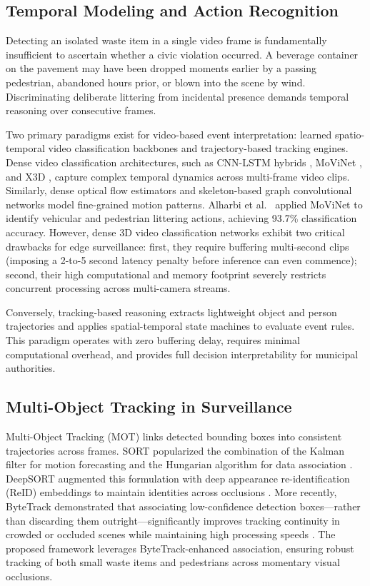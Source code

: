 \documentclass[conference]{IEEEtran}
\begin{document}
\subsection{Temporal Modeling and Action Recognition}

Detecting an isolated waste item in a single video frame is fundamentally insufficient to ascertain whether a civic violation occurred. A beverage container on the pavement may have been dropped moments earlier by a passing pedestrian, abandoned hours prior, or blown into the scene by wind. Discriminating deliberate littering from incidental presence demands temporal reasoning over consecutive frames.

Two primary paradigms exist for video-based event interpretation: learned spatio-temporal video classification backbones and trajectory-based tracking engines. Dense video classification architectures, such as CNN-LSTM hybrids \cite{b9}, MoViNet \cite{b10}, and X3D \cite{b23}, capture complex temporal dynamics across multi-frame video clips. Similarly, dense optical flow estimators \cite{b16} and skeleton-based graph convolutional networks \cite{b17} model fine-grained motion patterns. Alharbi et al.\ \cite{b10} applied MoViNet to identify vehicular and pedestrian littering actions, achieving 93.7\% classification accuracy. However, dense 3D video classification networks exhibit two critical drawbacks for edge surveillance: first, they require buffering multi-second clips (imposing a 2-to-5 second latency penalty before inference can even commence); second, their high computational and memory footprint severely restricts concurrent processing across multi-camera streams.

Conversely, tracking-based reasoning extracts lightweight object and person trajectories and applies spatial-temporal state machines to evaluate event rules. This paradigm operates with zero buffering delay, requires minimal computational overhead, and provides full decision interpretability for municipal authorities.

\subsection{Multi-Object Tracking in Surveillance}

Multi-Object Tracking (MOT) links detected bounding boxes into consistent trajectories across frames. SORT popularized the combination of the Kalman filter for motion forecasting and the Hungarian algorithm for data association \cite{b18}. DeepSORT augmented this formulation with deep appearance re-identification (ReID) embeddings to maintain identities across occlusions \cite{b19}. More recently, ByteTrack demonstrated that associating low-confidence detection boxes---rather than discarding them outright---significantly improves tracking continuity in crowded or occluded scenes while maintaining high processing speeds \cite{b22}. The proposed framework leverages ByteTrack-enhanced association, ensuring robust tracking of both small waste items and pedestrians across momentary visual occlusions.
\end{document}
